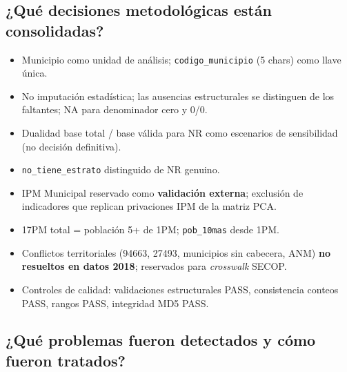 \subsection{¿Qué decisiones metodológicas están consolidadas?}

\begin{itemize}
    \item Municipio como unidad de análisis; \texttt{codigo\_municipio} (5 chars) como llave única.
    \item No imputación estadística; las ausencias estructurales se distinguen de los faltantes; NA para denominador cero y 0/0.
    \item Dualidad base total / base válida para NR como escenarios de sensibilidad (no decisión definitiva).
    \item \texttt{no\_tiene\_estrato} distinguido de NR genuino.
    \item IPM Municipal reservado como \textbf{validación externa}; exclusión de indicadores que replican privaciones IPM de la matriz PCA.
    \item 17PM total = población 5+ de 1PM; \texttt{pob\_10mas} desde 1PM.
    \item Conflictos territoriales (94663, 27493, municipios sin cabecera, ANM) \textbf{no resueltos en datos 2018}; reservados para \textit{crosswalk} SECOP.
    \item Controles de calidad: validaciones estructurales PASS, consistencia conteos PASS, rangos PASS, integridad MD5 PASS.
\end{itemize}

\subsection{¿Qué problemas fueron detectados y cómo fueron tratados?}

